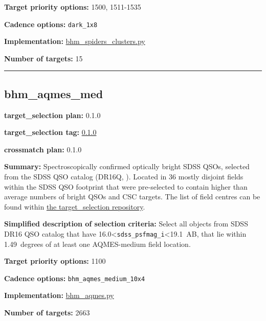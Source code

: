 \noindent\textbf{Target priority options:} 1500, 1511-1535

\noindent\textbf{Cadence options:} \texttt{dark\_1x8}

\noindent\textbf{Implementation:}
\href{https://github.com/sdss/target_selection/blob/0.1.0/python/target_selection/cartons/bhm_spiders_clusters.py}{bhm\_spiders\_clusters.py}

\noindent\textbf{Number of targets:} 15

\begin{center}\rule{0.5\linewidth}{0.5pt}\end{center}

\hypertarget{bhm_aqmes_med_plan0.1.0}{%
\subsection{bhm\_aqmes\_med}\label{bhm_aqmes_med_plan0.1.0}}

\noindent\textbf{target\_selection plan:} 0.1.0

\noindent\textbf{target\_selection tag:}
\href{https://github.com/sdss/target_selection/tree/0.1.0/}{0.1.0}

\noindent\textbf{crossmatch plan:} 0.1.0

\noindent\textbf{Summary:} Spectroscopically confirmed optically bright SDSS
QSOs, selected from the SDSS QSO catalog (DR16Q,
\citealt{Lyke2020}). Located in 36 mostly disjoint fields within the SDSS QSO
footprint that were pre-selected to contain higher than average numbers
of bright QSOs and CSC targets. The list of field centres can be found
within
\href{https://github.com/sdss/target_selection/blob/0.1.0/python/target_selection/masks/candidate_target_fields_bhm_aqmes_med_v0.2.1.fits}{the
target\_selection repository}.

\noindent\textbf{Simplified description of selection criteria:} Select all
objects from SDSS DR16 QSO catalog that have
16.0\textless{}\texttt{sdss\_psfmag\_i}\textless19.1~AB, that lie within
1.49~degrees of at least one AQMES-medium field location.


\noindent\textbf{Target priority options:} 1100

\noindent\textbf{Cadence options:} \texttt{bhm\_aqmes\_medium\_10x4}

\noindent\textbf{Implementation:}
\href{https://github.com/sdss/target_selection/blob/0.1.0/python/target_selection/cartons/bhm_aqmes.py}{bhm\_aqmes.py}

\noindent\textbf{Number of targets:} 2663

